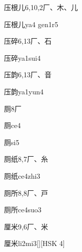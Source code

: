 \begin{entry}{压根儿}{6,10,2}{⼚、⽊、⼉}
  \begin{phonetics}{压根儿}{ya4 gen1r5}
  \end{phonetics}
\end{entry}

\begin{entry}{压碎}{6,13}{⼚、⽯}
  \begin{phonetics}{压碎}{ya1sui4}
  \end{phonetics}
\end{entry}

\begin{entry}{压韵}{6,13}{⼚、⾳}
  \begin{phonetics}{压韵}{ya1yun4}
  \end{phonetics}
\end{entry}

\begin{entry}{厕}{8}{⼚}
  \begin{phonetics}{厕}{ce4}
  \end{phonetics}
  \begin{phonetics}{厕}{si5}
  \end{phonetics}
\end{entry}

\begin{entry}{厕纸}{8,7}{⼚、⽷}
  \begin{phonetics}{厕纸}{ce4zhi3}
  \end{phonetics}
\end{entry}

\begin{entry}{厕所}{8,8}{⼚、⼾}
  \begin{phonetics}{厕所}{ce4suo3}
  \end{phonetics}
\end{entry}

\begin{entry}{厘米}{9,6}{⼚、⽶}
  \begin{phonetics}{厘米}{li2mi3}[][HSK 4]
  \end{phonetics}
\end{entry}

